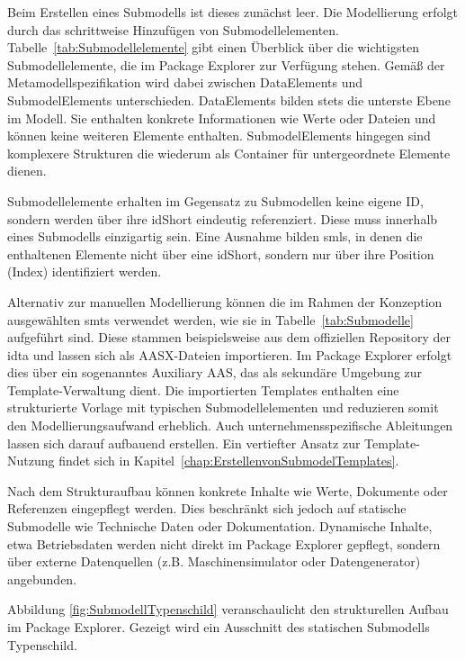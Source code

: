 Beim Erstellen eines Submodells ist dieses zunächst leer. 
Die Modellierung erfolgt durch das schrittweise Hinzufügen von Submodellelementen.
Tabelle~\ref{tab:Submodellelemente} gibt einen Überblick über die wichtigsten Submodellelemente, die im Package Explorer zur Verfügung stehen.
Gemäß der Metamodellspezifikation \cite{SpezifikationPart1} wird dabei zwischen DataElements und SubmodelElements unterschieden.
DataElements bilden stets die unterste Ebene im Modell. Sie enthalten konkrete Informationen wie Werte oder Dateien und können keine weiteren Elemente enthalten.
SubmodelElements hingegen sind komplexere Strukturen die wiederum als Container für untergeordnete Elemente dienen.



Submodellelemente erhalten im Gegensatz zu Submodellen keine eigene ID, sondern werden über ihre idShort eindeutig referenziert.
Diese muss innerhalb eines Submodells einzigartig sein.
Eine Ausnahme bilden \acsp{sml}, in denen die enthaltenen Elemente nicht über eine idShort, sondern nur über ihre Position (Index) identifiziert werden.



Alternativ zur manuellen Modellierung können die im Rahmen der Konzeption ausgewählten \acsp{smt} verwendet werden, wie sie in Tabelle~\ref{tab:Submodelle} aufgeführt sind.
Diese stammen beispielsweise aus dem offiziellen Repository der \acs{idta} \cite{idtaTemplates} und lassen sich als AASX-Dateien importieren.
Im Package Explorer erfolgt dies über ein sogenanntes Auxiliary AAS, das als sekundäre Umgebung zur Template-Verwaltung dient.
Die importierten Templates enthalten eine strukturierte Vorlage mit typischen Submodellelementen und reduzieren somit den Modellierungsaufwand erheblich.
Auch unternehmensspezifische Ableitungen lassen sich darauf aufbauend erstellen.
Ein vertiefter Ansatz zur Template-Nutzung findet sich in Kapitel~\ref{chap:ErstellenvonSubmodelTemplates}.

Nach dem Strukturaufbau können konkrete Inhalte wie Werte, Dokumente oder Referenzen eingepflegt werden.
Dies beschränkt sich jedoch auf statische Submodelle wie Technische Daten oder Dokumentation.
Dynamische Inhalte, etwa Betriebsdaten werden nicht direkt im Package Explorer gepflegt, sondern über externe Datenquellen (z.B. Maschinensimulator oder Datengenerator) angebunden.

Abbildung \ref{fig:SubmodellTypenschild} veranschaulicht den strukturellen Aufbau im Package Explorer. 
Gezeigt wird ein Ausschnitt des statischen Submodells Typenschild.

